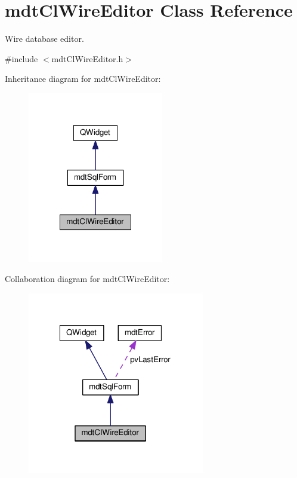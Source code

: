 \hypertarget{classmdt_cl_wire_editor}{\section{mdt\-Cl\-Wire\-Editor Class Reference}
\label{classmdt_cl_wire_editor}
}


Wire database editor.  




{\ttfamily \#include $<$mdt\-Cl\-Wire\-Editor.\-h$>$}



Inheritance diagram for mdt\-Cl\-Wire\-Editor\-:\nopagebreak
\begin{figure}[H]
\begin{center}
\leavevmode
\includegraphics[width=168pt]{classmdt_cl_wire_editor__inherit__graph}
\end{center}
\end{figure}


Collaboration diagram for mdt\-Cl\-Wire\-Editor\-:\nopagebreak
\begin{figure}[H]
\begin{center}
\leavevmode
\includegraphics[width=219pt]{classmdt_cl_wire_editor__coll__graph}
\end{center}
\end{figure}
